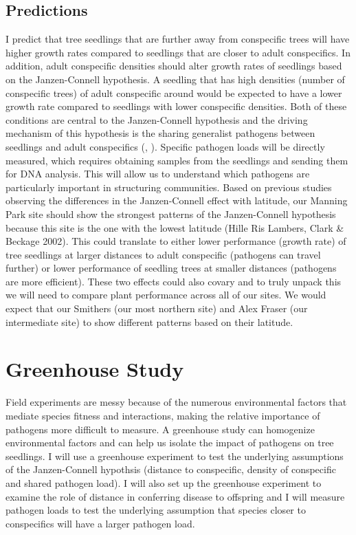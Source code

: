 \documentclass{article}
\begin{document}
\subsection{Predictions}
I predict that tree seedlings that are further away from conspecific trees will have higher growth rates compared to seedlings that are closer to adult conspecifics. In addition, adult conspecific densities should alter growth rates of seedlings based on the Janzen-Connell hypothesis. A seedling that has high densities (number of conspecific trees) of adult conspecific around would be expected to have a lower growth rate compared to seedlings with lower conspecific densities. Both of these conditions are central to the Janzen-Connell hypothesis and the driving mechanism of this hypothesis is the sharing generalist pathogens between seedlings and adult conspecifics (\citep{Janzen1970}, \citep{Connell1978}). Specific pathogen loads will be directly measured, which requires obtaining samples from the seedlings and sending them for DNA analysis. This will allow us to understand which pathogens are particularly important in structuring communities. Based on previous studies observing the differences in the Janzen-Connell effect with latitude, our Manning Park site should show the strongest patterns of the Janzen-Connell hypothesis because this site is the one with the lowest latitude (Hille Ris Lambers, Clark & Beckage 2002). This could translate to either lower performance (growth rate) of tree seedlings at larger distances to adult conspecific (pathogens can travel further) or lower performance of seedling trees at smaller distances (pathogens are more efficient). These two effects could also covary and to truly unpack this we will need to compare plant performance across all of our sites. We would expect that our Smithers (our most northern site) and Alex Fraser (our intermediate site) to show different patterns based on their latitude. 

\section{Greenhouse Study}
Field experiments are messy because of the numerous environmental factors that mediate species fitness and interactions, making the relative importance of pathogens more difficult to measure. A greenhouse study can homogenize environmental factors and can help us isolate the impact of pathogens on tree seedlings. I will use a greenhouse experiment to test  the underlying assumptions of the Janzen-Connell hypothsis (distance to conspecific, density of conspecific and shared pathogen load). I will also set up the greenhouse experiment to examine the role of distance in conferring disease to offspring and I will measure pathogen loads to test the underlying assumption that species closer to conspecifics will have a larger pathogen load. 
\end{document}
